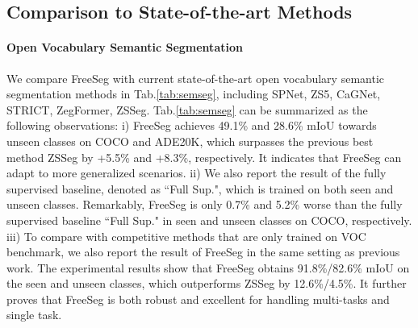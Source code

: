 \documentclass[10pt,twocolumn,letterpaper]{article}
\begin{document}
\subsection{Comparison to State-of-the-art Methods}


\paragraph{Open Vocabulary Semantic Segmentation}
We compare FreeSeg with current state-of-the-art open vocabulary semantic segmentation methods in Tab.\ref{tab:semseg},  including SPNet\cite{xian2019semantic}, ZS5\cite{bucher2019zero}, CaGNet\cite{gu2020context}, STRICT\cite{pastore2021closer}, ZegFormer\cite{ding2022decoupling}, ZSSeg\cite{xu2021simple}.
Tab.\ref{tab:semseg} can be summarized as the following observations:
i) FreeSeg achieves 49.1\% and 28.6\% mIoU towards unseen classes on COCO and ADE20K, which surpasses the previous best method ZSSeg by +5.5\%  and +8.3\%, respectively. It indicates that FreeSeg can adapt to more generalized scenarios.
ii) 
We also report the result of the fully supervised baseline, denoted as ``Full Sup.", which is trained on both seen and unseen classes.
Remarkably, FreeSeg is only 0.7\% and 5.2\% worse than the fully supervised baseline ``Full Sup." in seen and unseen classes on COCO, respectively.
iii) To compare with competitive methods that are only trained on VOC benchmark, we also report the result of FreeSeg in the same setting as previous work. The experimental results show that FreeSeg obtains 91.8\%/82.6\% mIoU on the seen and unseen classes, which outperforms ZSSeg by 12.6\%/4.5\%. It further proves that FreeSeg is both robust and excellent for handling multi-tasks and single task.
\end{document}
